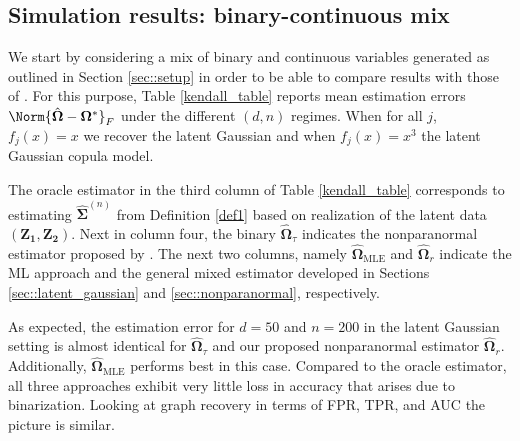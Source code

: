 \subsection{Simulation results: binary-continuous mix}

We start by considering a mix of binary and continuous variables generated as outlined in Section \ref{sec::setup} in order to be able to compare results with those of \citet{Fan17}. For this purpose, Table \ref{kendall_table} reports mean estimation errors $\Norm{\hat{\boldsymbol\Omega} - \boldsymbol\Omega^*}_F$ under the different $(d,n)$ regimes. When for all $j$, $f_j(x) = x$ we recover the latent Gaussian and when $f_j(x) = x^3$ the latent Gaussian copula model.

The oracle estimator in the third column of Table \ref{kendall_table} corresponds to estimating $\hat{\boldsymbol\Sigma}^{(n)}$ from Definition \ref{def1} based on realization of the latent data $(\boldsymbol{Z_1},\boldsymbol{Z_2})$. Next in column four, the binary $\hat{\boldsymbol\Omega}_\tau$ indicates the nonparanormal estimator proposed by \citet{Fan17}. The next two columns, namely $\hat{\boldsymbol\Omega}_{\text{MLE}}$ and $\hat{\boldsymbol\Omega}_r$ indicate the ML approach and the general mixed estimator developed in Sections \ref{sec::latent_gaussian} and \ref{sec::nonparanormal}, respectively.

As expected, the estimation error for $d = 50$ and $n=200$ in the latent Gaussian setting is almost identical for $\hat{\boldsymbol\Omega}_\tau$ and our proposed nonparanormal estimator $\hat{\boldsymbol\Omega}_r$. Additionally, $\hat{\boldsymbol\Omega}_{\text{MLE}}$ performs best in this case. Compared to the oracle estimator, all three approaches exhibit very little loss in accuracy that arises due to binarization. Looking at graph recovery in terms of FPR, TPR, and AUC the picture is similar.

